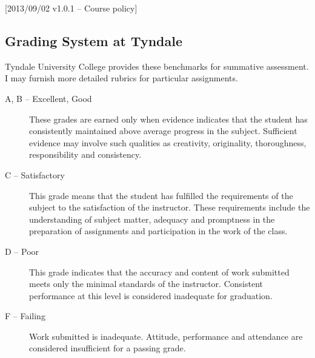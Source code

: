 [2013/09/02 v1.0.1 -- Course policy]

\subsection{Grading System at Tyndale}
\label{grades}

Tyndale University College provides these benchmarks for summative assessment.
I may furnish more detailed rubrics for particular assignments.


\begin{description}
  \item[A, B -- Excellent, Good]
    These grades are earned only when evidence indicates that the student
    has consistently maintained above average progress in the subject.
    Sufficient evidence may involve such qualities as creativity, originality,
    thoroughness, responsibility and consistency.
  \item[C -- Satisfactory]
    This grade means that the student has fulfilled the requirements of the
    subject to the satisfaction of the instructor. These requirements include
    the understanding of subject matter, adequacy and promptness in the
    preparation of assignments and participation in the work of the class.
  \item[D -- Poor]
    This grade indicates that the accuracy and content of work submitted meets
    only the minimal standards of the instructor. Consistent performance at
    this level is considered inadequate for graduation.
  \item[F -- Failing]
    Work submitted is inadequate. Attitude, performance and attendance are
    considered insufficient for a passing grade.
\end{description}
